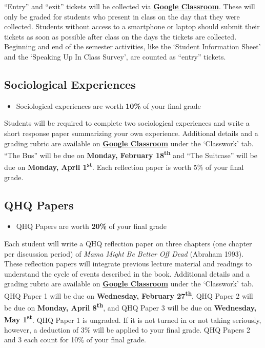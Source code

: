\documentclass[]{book}
\newenvironment{rmdblock}[1]
  {\begin{shaded*}
  \begin{itemize}
  \renewcommand{\labelitemi}{
    \raisebox{-.7\height}[0pt][0pt]{
      {\setkeys{Gin}{width=3em,keepaspectratio}\texttt{[image: images/\#1]}}
    }
  }
  \item
  }
  {
  \end{itemize}
  \end{shaded*}
  }
\newenvironment{rmdtip}
  {\begin{rmdblock}{tip}}
  {\end{rmdblock}}
\begin{document}
``Entry'' and ``exit'' tickets will be collected via \textbf{\href{https://classroom.google.com}{Google Classroom}}. These will only be graded for students who present in class on the day that they were collected. Students without access to a smartphone or laptop should submit their tickets as soon as possible after class on the days the tickets are collected. Beginning and end of the semester activities, like the `Student Information Sheet' and the `Speaking Up In Class Survey', are counted as ``entry'' tickets.

\hypertarget{sociological-experiences}{%
\subsection{Sociological Experiences}\label{sociological-experiences}}

\begin{rmdtip}
Sociological experiences are worth \textbf{10\%} of your final grade
\end{rmdtip}

Students will be required to complete two sociological experiences and write a short response paper summarizing your own experience. Additional details and a grading rubric are available on \textbf{\href{https://classroom.google.com}{Google Classroom}} under the `Classwork' tab. ``The Bus'' will be due on \textbf{Monday, February 18\textsuperscript{th}} and ``The Suitcase'' will be due on \textbf{Monday, April 1\textsuperscript{st}}. Each reflection paper is worth 5\% of your final grade.

\hypertarget{qhq-papers}{%
\subsection{QHQ Papers}\label{qhq-papers}}

\begin{rmdtip}
QHQ Papers are worth \textbf{20\%} of your final grade
\end{rmdtip}

Each student will write a QHQ reflection paper on three chapters (one chapter per discussion period) of \emph{Mama Might Be Better Off Dead} (Abraham 1993). These reflection papers will integrate previous lecture material and readings to understand the cycle of events described in the book. Additional details and a grading rubric are available on \textbf{\href{https://classroom.google.com}{Google Classroom}} under the `Classwork' tab. QHQ Paper 1 will be due on \textbf{Wednesday, February 27\textsuperscript{th}}, QHQ Paper 2 will be due on \textbf{Monday, April 8\textsuperscript{th}}, and QHQ Paper 3 will be due on \textbf{Wednesday, May 1\textsuperscript{st}}. QHQ Paper 1 is ungraded. If it is not turned in or not taking seriously, however, a deduction of 3\% will be applied to your final grade. QHQ Papers 2 and 3 each count for 10\% of your final grade.
\end{document}
